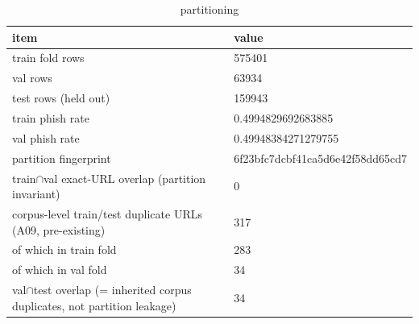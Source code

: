 \begin{table}[htbp]
\caption{partitioning}
\label{tab:partitioning}
\begin{tabular}{ll}
\toprule
item & value \\
\midrule
train fold rows & 575401 \\
val rows & 63934 \\
test rows (held out) & 159943 \\
train phish rate & 0.4994829692683885 \\
val phish rate & 0.49948384271279755 \\
partition fingerprint & 6f23bfc7dcbf41ca5d6e42f58dd65cd7 \\
train$\cap$val exact-URL overlap (partition invariant) & 0 \\
corpus-level train/test duplicate URLs (A09, pre-existing) & 317 \\
  of which in train fold & 283 \\
  of which in val fold & 34 \\
val$\cap$test overlap (= inherited corpus duplicates, not partition leakage) & 34 \\
\bottomrule
\end{tabular}
\end{table}
